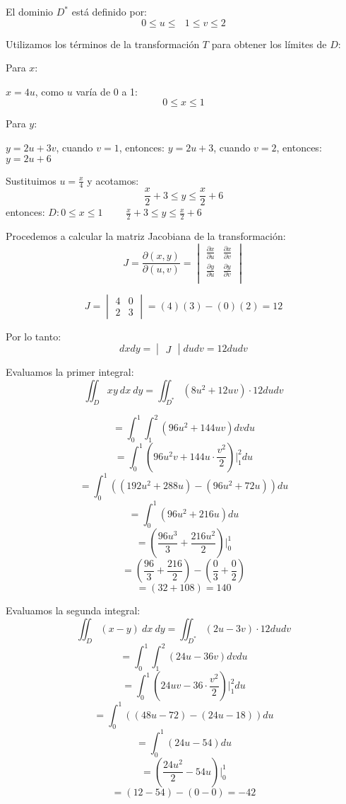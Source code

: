 El dominio $D^*$ está definido por:
$$0 \leq u \leq \ \ \  1 \leq v \leq 2$$

Utilizamos los términos de la transformación $T$ para obtener los límites de $D$:

\vspace{1em}

Para $x$:

$x = 4u$, como $u$ varía de 0 a 1:
$$0 \leq x \leq 1$$

\vspace{1em}

Para $y$:

$y = 2u + 3v$, cuando $v = 1$, entonces: $y = 2u + 3$, cuando $v = 2$, entonces: $y= 2u + 6$

Sustituimos $u = \frac{x}{4}$ y acotamos:
$$\frac{x}{2} + 3 \leq y \leq \frac{x}{2} + 6$$
entonces: $D: 0 \leq x \leq 1$ \ \ \ \ $\frac{x}{2} + 3 \leq y \leq \frac{x}{2} + 6$

Procedemos a calcular la matriz Jacobiana de la transformación:
$$J = \frac{\partial(x,y)}{\partial(u,v)} = \begin{vmatrix}
    \frac{\partial x}{\partial u} & \frac{\partial x}{\partial v}\\
\frac{\partial y}{\partial u} & \frac{\partial y}{\partial v}\\
\end{vmatrix}$$

$$J = \begin{vmatrix}
4 & 0\\
2 & 3
\end{vmatrix} = (4)(3) - (0)(2) = 12$$

Por lo tanto: $$dxdy = \begin{vmatrix}
J
\end{vmatrix} dudv = 12dudv$$

Evaluamos la primer integral:
$$\iint_D xy \ dx \ dy = \iint_{D^*} (8u^2 + 12uv) \cdot 12dudv$$

$$= \int_{0}^{1}\int_{1}^{2} (96u^2 + 144uv)dvdu$$
$$= \int_{0}^{1}(96u^2v + 144u \cdot \frac{v^2}{2}) \Big|_1^2 du$$
$$= \int_{0}^{1}((192u^2 + 288u) - (96u^2 + 72u)) du$$
$$= \int_{0}^{1}(96u^2 + 216u) du$$
$$= (\frac{96u^3}{3} + \frac{216u^2}{2}) \Big|_0^1$$
$$= (\frac{96}{3} + \frac{216}{2}) - (\frac{0}{3} + \frac{0}{2})$$
$$= (32 + 108) = 140$$

\vspace{0.3cm}

Evaluamos la segunda integral:
$$\iint_D (x - y) \ dx \ dy = \iint_{D^*} (2u - 3v) \cdot 12dudv$$
$$= \int_{0}^{1}\int_{1}^{2} (24u - 36v)dvdu$$
$$= \int_{0}^{1}(24uv - 36 \cdot \frac{v^2}{2}) \Big|_1^2 du$$
$$= \int_{0}^{1}((48u - 72) - (24u -18)) du$$
$$= \int_{0}^{1}(24u - 54) du$$
$$= (\frac{24u^2}{2} - 54u) \Big|_0^1$$
$$= (12 - 54) - (0 - 0) = -42$$
